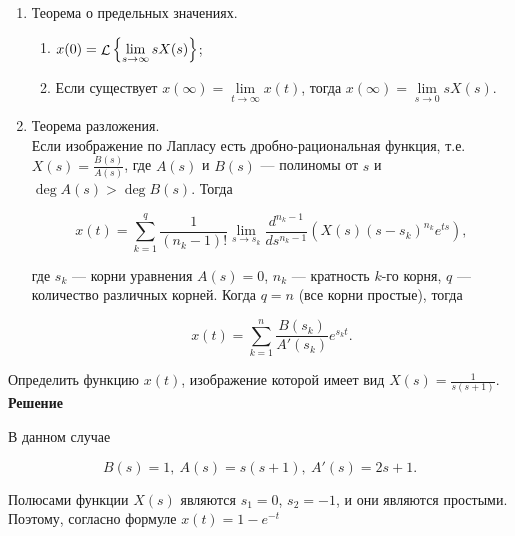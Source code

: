 \documentclass[../../TAU.tex]{subfiles}
\begin{document}
\begin{enumerate}
        \item Теорема о предельных значениях.
            \begin{enumerate}[label*={\arabic*}]
                \item 
                    $x(0) = \mathop{\mathcal{L}}\nolimits\left\{\lim\limits_{s\rightarrow\infty}sX(s)\right\}$;
                
                \item Если существует 
                    $x(\infty) = \lim\limits_{t\rightarrow\infty} x(t)$, тогда 
                    $x(\infty) = \lim\limits_{s\rightarrow0} sX(s)$.
            \end{enumerate}
        
        \item Теорема разложения. \\
            Если изображение по Лапласу есть дробно-рациональная функция, т.е. 
            $X(s) = \frac{B(s)}{A(s)}$, где 
            $A(s)$ и $B(s)$ --- полиномы от $s$ и 
            $\deg A(s) > \deg B(s)$. 
            Тогда
            
            \begin{equation}
                x(t) = \sum_{k=1}^q\frac{1}{(n_k-1)!}\lim\limits_{s\rightarrow s_k} \frac{d^{n_k-1}}{d s^{n_k-1}} (X(s)(s-s_k)^{n_k}e^{ts}),
            \end{equation}
            
            где $s_k$ --- корни уравнения 
            $A(s)=0$, $n_k$ --- кратность $k$-го корня, $q$ --- количество различных корней.
            Когда $q=n$ (все корни простые), тогда
        
            \begin{equation}\label{eq:razl}
                x(t) = \sum^{n}_{k=1}\frac{B(s_k)}{A'(s_k)} e^{s_kt}.
            \end{equation}

    \end{enumerate}

    \examp Определить функцию $x(t)$, изображение которой имеет вид 
    $
        X(s) = \frac{1}{s (s+1)}.
    $\\
    {\bf Решение}\par
    В данном случае

    \begin{equation}
        B(s) = 1,\ A(s) = s (s+1),\ A'(s) = 2 s + 1.
    \end{equation}

    Полюсами функции $X(s)$ являются $s_1 = 0$, $s_2 = -1$, и они являются простыми. Поэтому, согласно формуле  $x(t)=1-e^{-t}$
    
\end{document}
